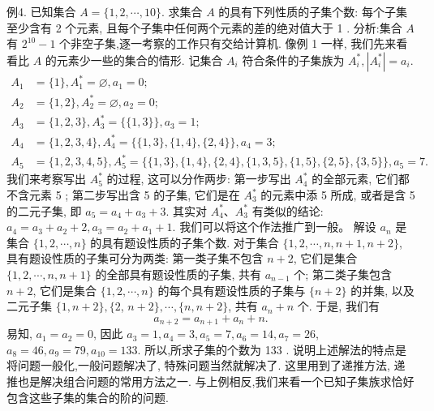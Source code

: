 例4. 已知集合 $A=\{1,2, \cdots, 10\}$. 求集合 $A$ 的具有下列性质的子集个数: 每个子集至少含有 2 个元素, 且每个子集中任何两个元素的差的绝对值大于 1 .
分析:集合 $A$ 有 $2^{10}-1$ 个非空子集,逐一考察的工作只有交给计算机.
像例 1 一样, 我们先来看看比 $A$ 的元素少一些的集合的情形.
记集合 $A_i$ 符合条件的子集族为 $A_i^*,\left|A_i^*\right|=a_i$.
$$
\begin{aligned}
A_1 & =\{1\}, A_1^*=\varnothing, a_1=0 ; \\
A_2 & =\{1,2\}, A_2^*=\varnothing, a_2=0 ; \\
A_3 & =\{1,2,3\}, A_3^*=\{\{1,3\}\}, a_3=1 ; \\
A_4 & =\{1,2,3,4\}, A_4^*=\{\{1,3\},\{1,4\},\{2,4\}\}, a_4=3 ; \\
A_5 & =\{1,2,3,4,5\}, A_5^*=\{\{1,3\},\{1,4\},\{2,4\},\{1,3,5\}, \{1,5\},\{2,5\},\{3,5\}\}, a_5=7 . &
\end{aligned}
$$
我们来考察写出 $A_5^*$ 的过程, 这可以分作两步: 第一步写出 $A_4^*$ 的全部元素, 它们都不含元素 5 ; 第二步写出含 5 的子集, 它们是在 $A_3^*$ 的元素中添 5 所成, 或者是含 5 的二元子集, 即 $a_5=a_4+a_3+3$. 其实对 $A_4^* 、 A_3^*$ 有类似的结论: $a_4=a_3+a_2+2, a_3=a_2+a_1+1$. 我们可以将这个作法推广到一般。
解设 $a_n$ 是集合 $\{1,2, \cdots, n\}$ 的具有题设性质的子集个数.
对于集合 $\{1,2, \cdots, n, n+1, n+2\}$, 具有题设性质的子集可分为两类: 第一类子集不包含 $n+2$, 它们是集合 $\{1,2, \cdots, n, n+1\}$ 的全部具有题设性质的子集, 共有 $a_{n-1}$ 个; 第二类子集包含 $n+2$, 它们是集合 $\{1,2, \cdots, n\}$ 的每个具有题设性质的子集与 $\{n+2\}$ 的并集, 以及二元子集 $\{1, n+2\},\{2$, $n+2\}, \cdots,\{n, n+2\}$, 共有 $a_n+n$ 个.
于是, 我们有
$$
a_{n+2}=a_{n+1}+a_n+n .
$$
易知, $a_1=a_2=0$, 因此 $a_3=1, a_4=3, a_5=7, a_6=14, a_7=26$, $a_8=46, a_9=79, a_{10}=133$.
所以,所求子集的个数为 133 .
说明上述解法的特点是将问题一般化,一般问题解决了, 特殊问题当然就解决了.
这里用到了递推方法, 递推也是解决组合问题的常用方法之一.
与上例相反,我们来看一个已知子集族求恰好包含这些子集的集合的阶的问题.




